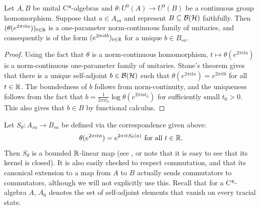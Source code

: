 \documentclass[12pt]{amsart}
\begin{document}
\begin{lemma}\label{lem:stone-theorem-cons}
Let $A,B$ be unital C*-algebras and $\theta: U^0(A) \to U^0(B)$ be a continuous group homomorphism. Suppose that $a \in A_{sa}$ and represent $B \subseteq \mathcal{B}(\mathcal{H})$ faithfully. Then $(\theta(e^{2\pi i t a}))_{t \in \mathbb{R}}$ is a one-parameter norm-continuous family of unitaries, and consequently is of the form $(e^{2\pi i t b})_{t \in \mathbb{R}}$ for a unique $b \in B_{sa}$. 
\begin{proof}
Using the fact that $\theta$ is a norm-continuous homomorphism, $t \mapsto \theta(e^{2\pi i t a})$ is a norm-continuous one-parameter family of unitaries. Stone's theorem gives that there is a unique self-adjoint $b \in \mathcal{B}(\mathcal{H})$ such that $\theta(e^{2\pi i ta}) = e^{2\pi i tb}$ for all $t \in \mathbb{R}$. The boundedness of $b$ follows from norm-continuity, and the uniqueness follows from the fact that $b = \frac{1}{2\pi i t_0} \log \theta(e^{2\pi i a t_0})$ for sufficiently small $t_0 > 0$. This also gives that $b \in B$ by functional calculus. 
\end{proof}
\end{lemma}

Let $S_\theta: A_{sa} \to B_{sa}$ be defined via the correspondence given above: 
\begin{equation}
\theta(e^{2\pi i t a}) = e^{2\pi i t S_\theta(a)} \text{ for all } t \in \mathbb{R}.
\end{equation}
Then $S_\theta$ is a bounded $\mathbb{R}$-linear map (see \cite{Sakai55,HatoriMolnar14}, or note that it is easy to see that its kernel is closed). It is also easily checked to respect commutation, and that its canonical extension to a map from $A$ to $B$ actually sends commutators to commutators, although we will not explicitly use this. Recall that for a C*-algebra $A$, $A_0$ denotes the set of self-adjoint elements that vanish on every tracial state. 
\end{document}
